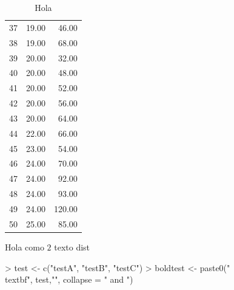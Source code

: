 \documentclass{article}
\begin{document}
\begin{table}[ht]
\begin{tabular}{rrr}
  37 & 19.00 & 46.00 \\ 
  38 & 19.00 & 68.00 \\ 
  39 & 20.00 & 32.00 \\ 
  40 & 20.00 & 48.00 \\ 
  41 & 20.00 & 52.00 \\ 
  42 & 20.00 & 56.00 \\ 
  43 & 20.00 & 64.00 \\ 
  44 & 22.00 & 66.00 \\ 
  45 & 23.00 & 54.00 \\ 
  46 & 24.00 & 70.00 \\ 
  47 & 24.00 & 92.00 \\ 
  48 & 24.00 & 93.00 \\ 
  49 & 24.00 & 120.00 \\ 
  50 & 25.00 & 85.00 \\ 
   \hline
\end{tabular}
\caption{Hola} 
\end{table}
Hola como $2$ texto  dist

\begin{Schunk}
\begin{Sinput}
> test <- c("testA", "testB", "testC")
> boldtest <- paste0("\\textbf{", test,"}", collapse = " and ")
\end{Sinput}
\end{Schunk}
\end{document}

